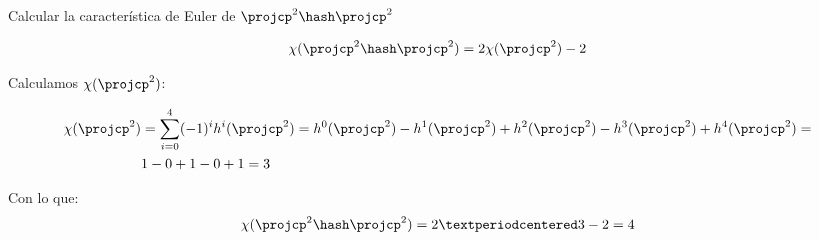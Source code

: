 \begin{problem}[6]

Calcular la característica de Euler de $\projcp^2\hash\projcp^2$

\solution
{}

\[
	\chi(\projcp^2\hash\projcp^2) = 2\chi(\projcp^2) - 2 
\]

Calculamos $\chi(\projcp^2)$:

\begin{align*}
	\chi(\projcp^2) &= \sum_{i=0}^4 (-1)^i h^i(\projcp^2) = h^0(\projcp^2) - h^1(\projcp^2) + h^2(\projcp^2) - h^3(\projcp^2) + h^4(\projcp^2) =\\
	&1-0+1-0+1 = 3
\end{align*}

Con lo que:
\[
	\chi(\projcp^2\hash\projcp^2) = 2·3 - 2 = 4
\]

\end{problem}

